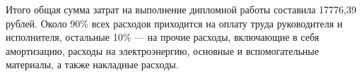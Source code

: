 Итого общая сумма затрат на выполнение дипломной работы составила 17776,39 рублей.
Около 90\% всех расходов приходится на оплату труда руководителя и исполнителя, остальные 10\% --- 
на прочие расходы, включающие в себя амортизацию, расходы на электроэнергию, основные и вспомогательные
материалы, а также накладные расходы.


%  
% 